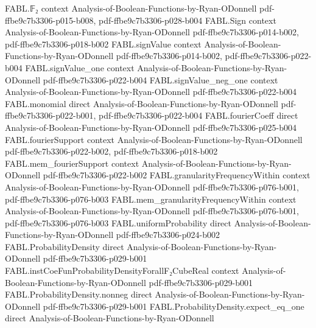 \begin{theorem}
\label{FABL.convolution_apply_add}
\leanok
{}
\proofstep
  {FABL.𝔽₂}
  {context}
  {Analysis-of-Boolean-Functions-by-Ryan-ODonnell}
  {pdf-ffbe9c7b3306-p015-b008,
    pdf-ffbe9c7b3306-p028-b004}
\proofstep
  {FABL.Sign}
  {context}
  {Analysis-of-Boolean-Functions-by-Ryan-ODonnell}
  {pdf-ffbe9c7b3306-p014-b002,
    pdf-ffbe9c7b3306-p018-b002}
\proofstep
  {FABL.signValue}
  {context}
  {Analysis-of-Boolean-Functions-by-Ryan-ODonnell}
  {pdf-ffbe9c7b3306-p014-b002,
    pdf-ffbe9c7b3306-p022-b004}
\proofstep
  {FABL.signValue_one}
  {context}
  {Analysis-of-Boolean-Functions-by-Ryan-ODonnell}
  {pdf-ffbe9c7b3306-p022-b004}
\proofstep
  {FABL.signValue_neg_one}
  {context}
  {Analysis-of-Boolean-Functions-by-Ryan-ODonnell}
  {pdf-ffbe9c7b3306-p022-b004}
\proofstep
  {FABL.monomial}
  {direct}
  {Analysis-of-Boolean-Functions-by-Ryan-ODonnell}
  {pdf-ffbe9c7b3306-p022-b001,
    pdf-ffbe9c7b3306-p022-b004}
\proofstep
  {FABL.fourierCoeff}
  {direct}
  {Analysis-of-Boolean-Functions-by-Ryan-ODonnell}
  {pdf-ffbe9c7b3306-p025-b004}
\proofstep
  {FABL.fourierSupport}
  {context}
  {Analysis-of-Boolean-Functions-by-Ryan-ODonnell}
  {pdf-ffbe9c7b3306-p022-b002,
    pdf-ffbe9c7b3306-p018-b002}
\proofstep
  {FABL.mem_fourierSupport}
  {context}
  {Analysis-of-Boolean-Functions-by-Ryan-ODonnell}
  {pdf-ffbe9c7b3306-p022-b002}
\proofstep
  {FABL.granularityFrequencyWithin}
  {context}
  {Analysis-of-Boolean-Functions-by-Ryan-ODonnell}
  {pdf-ffbe9c7b3306-p076-b001,
    pdf-ffbe9c7b3306-p076-b003}
\proofstep
  {FABL.mem_granularityFrequencyWithin}
  {context}
  {Analysis-of-Boolean-Functions-by-Ryan-ODonnell}
  {pdf-ffbe9c7b3306-p076-b001,
    pdf-ffbe9c7b3306-p076-b003}
\proofstep
  {FABL.uniformProbability}
  {direct}
  {Analysis-of-Boolean-Functions-by-Ryan-ODonnell}
  {pdf-ffbe9c7b3306-p024-b002}
\proofstep
  {FABL.ProbabilityDensity}
  {direct}
  {Analysis-of-Boolean-Functions-by-Ryan-ODonnell}
  {pdf-ffbe9c7b3306-p029-b001}
\proofstep
  {FABL.instCoeFunProbabilityDensityForallF₂CubeReal}
  {context}
  {Analysis-of-Boolean-Functions-by-Ryan-ODonnell}
  {pdf-ffbe9c7b3306-p029-b001}
\proofstep
  {FABL.ProbabilityDensity.nonneg}
  {direct}
  {Analysis-of-Boolean-Functions-by-Ryan-ODonnell}
  {pdf-ffbe9c7b3306-p029-b001}
\proofstep
  {FABL.ProbabilityDensity.expect_eq_one}
  {direct}
  {Analysis-of-Boolean-Functions-by-Ryan-ODonnell}

\end{theorem}
